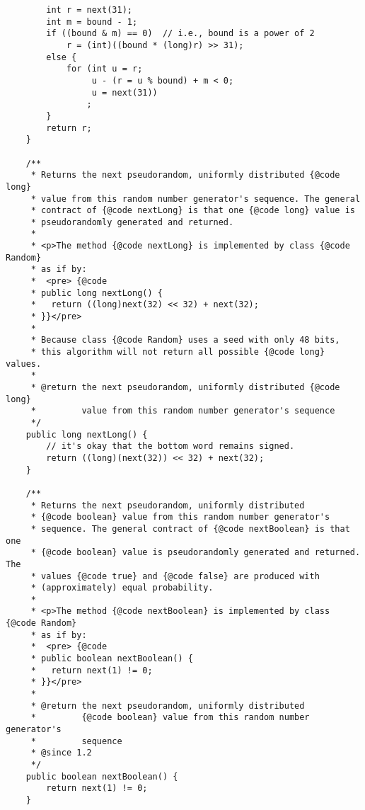 \documentclass[12pt,a4paper,twoside,openright,titlepage,final]{article}
\begin{document}
\begin{verbatim}
        int r = next(31);
        int m = bound - 1;
        if ((bound & m) == 0)  // i.e., bound is a power of 2
            r = (int)((bound * (long)r) >> 31);
        else {
            for (int u = r;
                 u - (r = u % bound) + m < 0;
                 u = next(31))
                ;
        }
        return r;
    }

    /**
     * Returns the next pseudorandom, uniformly distributed {@code long}
     * value from this random number generator's sequence. The general
     * contract of {@code nextLong} is that one {@code long} value is
     * pseudorandomly generated and returned.
     *
     * <p>The method {@code nextLong} is implemented by class {@code Random}
     * as if by:
     *  <pre> {@code
     * public long nextLong() {
     *   return ((long)next(32) << 32) + next(32);
     * }}</pre>
     *
     * Because class {@code Random} uses a seed with only 48 bits,
     * this algorithm will not return all possible {@code long} values.
     *
     * @return the next pseudorandom, uniformly distributed {@code long}
     *         value from this random number generator's sequence
     */
    public long nextLong() {
        // it's okay that the bottom word remains signed.
        return ((long)(next(32)) << 32) + next(32);
    }

    /**
     * Returns the next pseudorandom, uniformly distributed
     * {@code boolean} value from this random number generator's
     * sequence. The general contract of {@code nextBoolean} is that one
     * {@code boolean} value is pseudorandomly generated and returned.  The
     * values {@code true} and {@code false} are produced with
     * (approximately) equal probability.
     *
     * <p>The method {@code nextBoolean} is implemented by class {@code Random}
     * as if by:
     *  <pre> {@code
     * public boolean nextBoolean() {
     *   return next(1) != 0;
     * }}</pre>
     *
     * @return the next pseudorandom, uniformly distributed
     *         {@code boolean} value from this random number generator's
     *         sequence
     * @since 1.2
     */
    public boolean nextBoolean() {
        return next(1) != 0;
    }


\end{verbatim}
\end{document}
